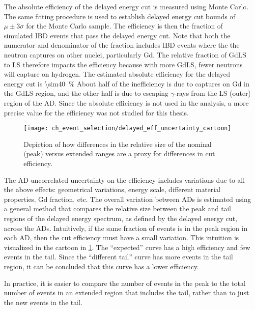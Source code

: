 The absolute efficiency of the delayed energy cut
is measured using Monte Carlo.
The same fitting procedure is used to establish
delayed energy cut bounds of $\mu \pm 3\sigma$ for the Monte Carlo sample.
The efficiency is then the fraction of simulated IBD events
that pass the delayed energy cut.
Note that both the numerator and denominator of the fraction includes IBD events
where the the neutron captures on other nuclei, particularly Gd.
The relative fraction of GdLS to LS therefore impacts the efficiency
because with more GdLS, fewer neutrons will capture on hydrogen.
The estimated absolute efficiency for the delayed energy cut
is \SI{\sim40}{\percent}
About half of the inefficiency is due to captures on Gd in the GdLS region,
and the other half is due to escaping $\gamma$-rays
from the LS (outer) region of the AD.
Since the absolute efficiency is not used in the \thetaot{} analysis,
a more precise value for the efficiency was not studied for this thesis.

\begin{figure}
    \centering
    \texttt{[image: ch\_event\_selection/delayed\_eff\_uncertainty\_cartoon]}
    \caption[Delayed energy efficiency diagram]{
        Depiction of how differences in the relative size
        of the nominal (peak) versus extended ranges
        are a proxy for differences in cut efficiency.
    }
    \label{fig:delayed_eff_unc_cartoon}
\end{figure}

The AD-uncorrelated uncertainty on the efficiency
includes variations due to all the above effects:
geometrical variations, energy scale, different material properties,
Gd fraction, etc.
The overall variation between ADs is estimated using a general method
that compares the relative size between the peak and tail regions
of the delayed energy spectrum, as defined by the delayed energy cut,
across the ADs.
Intuitively, if the same fraction of events is in the peak region in each AD,
then the cut efficiency must have a small variation.
This intuition is visualized in the cartoon in \cref{fig:delayed_eff_unc_cartoon}.
The ``expected'' curve has a high efficiency
and few events in the tail.
Since the ``different tail'' curve has more events in the tail region,
it can be concluded that this curve has a lower efficiency.

In practice, it is easier to compare the number of events in the peak
to the total number of events in an extended region that includes the tail,
rather than to just the new events in the tail.

